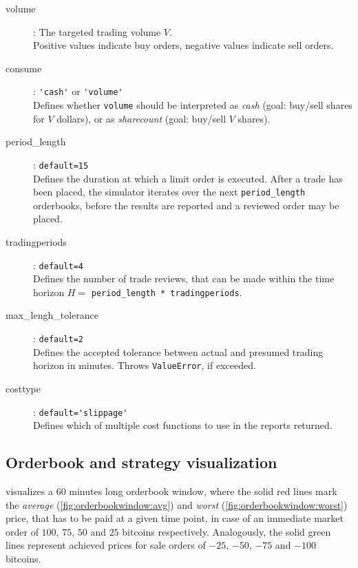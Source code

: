 \begin{description}
\item[volume] : The targeted trading volume $V$.\\
Positive values indicate buy orders, negative values indicate sell orders.
\item[consume] : \lstinline!'cash'! or \lstinline!'volume'!\\
Defines whether \lstinline!volume! should be interpreted as \emph{cash} (goal: buy/sell shares for $V$ dollars), or as \emph{sharecount} (goal: buy/sell $V$ shares).
\item[period\_length] : \lstinline!default=15!\\
Defines the duration at which a limit order is executed. After a trade has been placed, the simulator iterates over the next \lstinline!period_length! orderbooks, before the results are reported and a reviewed order may be placed.

\item[tradingperiods] : \lstinline!default=4!\\
Defines the number of trade reviews, that can be made within the time horizon $H =$ \lstinline!period_length * tradingperiods!.

\item[max\_lengh\_tolerance] : \lstinline!default=2!\\
Defines the accepted tolerance between actual and presumed trading horizon in minutes. Throws \lstinline!ValueError!, if exceeded.

\item[costtype] : \lstinline!default='slippage'!\\
Defines which of multiple cost functions to use in the reports returned. 
\end{description}

\subsection{Orderbook and strategy visualization}

 visualizes a 60 minutes long orderbook window, where the solid red lines mark the \emph{average} (\ref{fig:orderbookwindow:avg}) and \emph{worst} (\ref{fig:orderbookwindow:worst}) price, that has to be paid at a given time point, in case of an immediate market order of $100$, $75$, $50$ and $25$ bitcoins respectively. Analogously, the solid green lines represent achieved prices for sale orders of $-25$, $-50$, $-75$ and $-100$ bitcoins.\\

